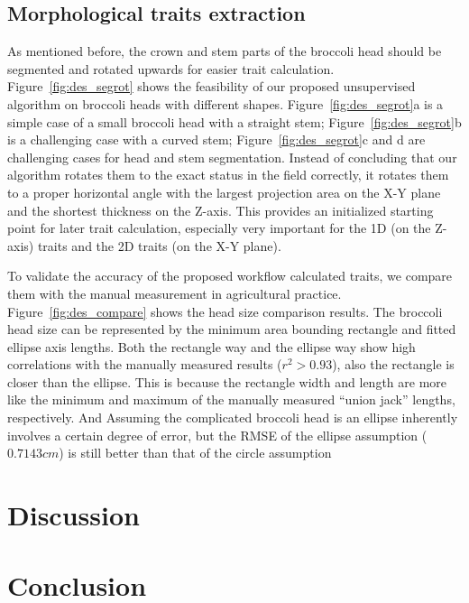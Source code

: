 

\subsection{Morphological traits extraction}

As mentioned before, the crown and stem parts of the broccoli head should be segmented and rotated upwards for easier trait calculation. Figure~\ref{fig:des_segrot} shows the feasibility of our proposed unsupervised algorithm on broccoli heads with different shapes. Figure~\ref{fig:des_segrot}a is a simple case of a small broccoli head with a straight stem; Figure~\ref{fig:des_segrot}b is a challenging case with a curved stem;  Figure~\ref{fig:des_segrot}c and d are challenging cases for head and stem segmentation. Instead of concluding that our algorithm rotates them to the exact status in the field correctly, it rotates them to a proper horizontal angle with the largest projection area on the X-Y plane and the shortest thickness on the Z-axis. This provides an initialized starting point for later trait calculation, especially very important for the 1D (on the Z-axis) traits and the 2D traits (on the X-Y plane).



To validate the accuracy of the proposed workflow calculated traits, we compare them with the manual measurement in agricultural practice. Figure~\ref{fig:des_compare} shows the head size comparison results. The broccoli head size can be represented by the minimum area bounding rectangle and fitted ellipse axis lengths. Both the rectangle way and the ellipse way show high correlations with the manually measured results ($r^2>0.93$), also the rectangle is closer than the ellipse. This is because the rectangle width and length are more like the minimum and maximum of the manually measured ``union jack'' lengths, respectively. And Assuming the complicated broccoli head is an ellipse inherently involves a certain degree of error, but the RMSE of the ellipse assumption ($0.7143 cm$) is still better than that of the circle assumption \citep[Table 5, RMSE$=0.97 cm$]{blok_image_2021}



\section{Discussion}



\section{Conclusion}
